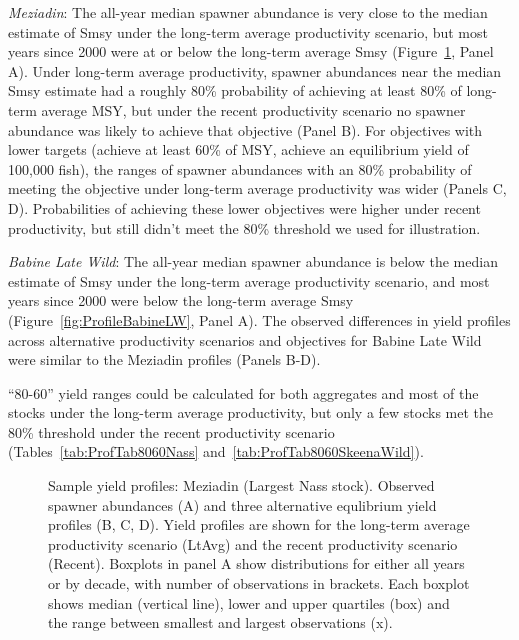 \documentclass[french,11pt]{book}
\begin{document}
\emph{Meziadin}: The all-year median spawner abundance is very close to the median estimate of Smsy under the long-term average productivity scenario, but most years since 2000 were at or below the long-term average Smsy (Figure~\ref{fig:ProfileMezidian}, Panel A). Under long-term average productivity, spawner abundances near the median Smsy estimate had a roughly 80\% probability of achieving at least 80\% of long-term average MSY, but under the recent productivity scenario no spawner abundance was likely to achieve that objective (Panel B). For objectives with lower targets (achieve at least 60\% of MSY, achieve an equilibrium yield of 100,000 fish), the ranges of spawner abundances with an 80\% probability of meeting the objective under long-term average productivity was wider (Panels C, D). Probabilities of achieving these lower objectives were higher under recent productivity, but still didn't meet the 80\% threshold we used for illustration.

\emph{Babine Late Wild}: The all-year median spawner abundance is below the median estimate of Smsy under the long-term average productivity scenario, and most years since 2000 were below the long-term average Smsy (Figure~\ref{fig:ProfileBabineLW}, Panel A). The observed differences in yield profiles across alternative productivity scenarios and objectives for Babine Late Wild were similar to the Meziadin profiles (Panels B-D).

``80-60'' yield ranges could be calculated for both aggregates and most of the stocks under the long-term average productivity, but only a few stocks met the 80\% threshold under the recent productivity scenario (Tables~\ref{tab:ProfTab8060Nass} and~\ref{tab:ProfTab8060SkeenaWild}).


\begin{figure}[htb]

{\centering {} 

}

\caption{Sample yield profiles: Meziadin (Largest Nass stock). Observed spawner abundances (A) and three alternative equlibrium yield profiles (B, C, D). Yield profiles are shown for the long-term average productivity scenario (LtAvg) and the recent productivity scenario (Recent). Boxplots in panel A show distributions for either all years or by decade, with number of observations in brackets. Each boxplot shows median (vertical line), lower and upper quartiles (box) and the range between smallest and largest observations (x).}\label{fig:ProfileMezidian}
\end{figure}
\clearpage
\end{document}
